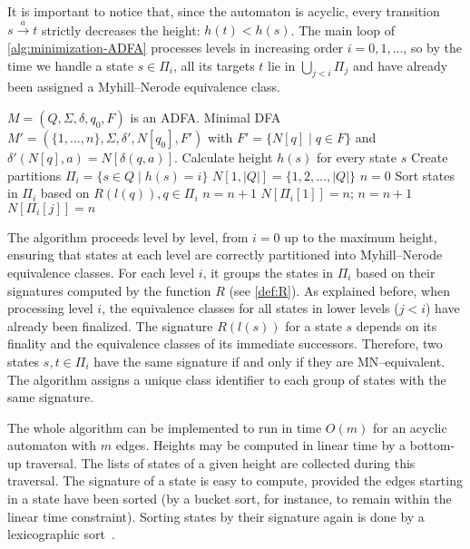 It is important to notice that, since the automaton is acyclic, every transition $s \xrightarrow{a} t$ strictly decreases the height: $h(t) < h(s)$. The main loop of \cref{alg:minimization-ADFA} processes levels in increasing order $i=0,1,\dots$, so by the time we handle a state $s\in\Pi_i$, all its targets $t$ lie in $\bigcup_{j<i}\Pi_j$ and have already been assigned a Myhill--Nerode equivalence class.

\begin{algorithm}[H]
    \caption{$\textsc{RevuzMinimization}(M)$}
    \label{alg:minimization-ADFA}
    \begin{algorithmic}[1]
    \Require $M=(Q,\Sigma,\delta,q_0,F)$ is an ADFA.
    \Ensure Minimal DFA $M'=(\{1,\dots,n\},\Sigma,\delta',N[q_0],F')$ with $F'=\{N[q]\mid q\in F\}$ and $\delta'(N[q],a)=N[\delta(q,a)]$.
    \State Calculate height $h(s)$ for every state $s$
    \State Create partitions $\Pi_i = \{s \in Q \mid h(s) = i\}$
    \State $N[1, |Q|] = \{1,2,\dots,|Q|\}$ 
    \State $n = 0$
     
        \State Sort states in $\Pi_i$ based on $R(l(q)), q\in \Pi_i$
        \State $n = n + 1$
        \State $N[\Pi_i[1]] = n$;
                \State $n = n + 1$
            \EndIf
            \State $N[\Pi_i[j]] = n$
        \EndFor
    \EndFor
    \end{algorithmic}
\end{algorithm}

The algorithm proceeds level by level, from $i=0$ up to the maximum height, ensuring that states at each level are correctly partitioned into Myhill--Nerode equivalence classes. For each level $i$, it groups the states in $\Pi_i$ based on their signatures computed by the function $R$ (see \cref{def:R}). As explained before, when processing level $i$, the equivalence classes for all states in lower levels ($j < i$) have already been finalized. The signature $R(l(s))$ for a state $s$ depends on its finality and the equivalence classes of its immediate successors. Therefore, two states $s, t \in \Pi_i$ have the same signature if and only if they are MN--equivalent. The algorithm assigns a unique class identifier to each group of states with the same signature.

The whole algorithm can be implemented to run in time $O(m)$ for an acyclic automaton with $m$ edges. Heights may be computed in linear time by
a bottom-up traversal. The lists of states of a given height are collected during this traversal. The signature of a state is easy to compute, provided the edges starting in a state have
been sorted (by a bucket sort, for instance, to remain within the linear time constraint).
Sorting states by their signature again is done by a lexicographic sort~\cite{berstel2010minimization}. 

